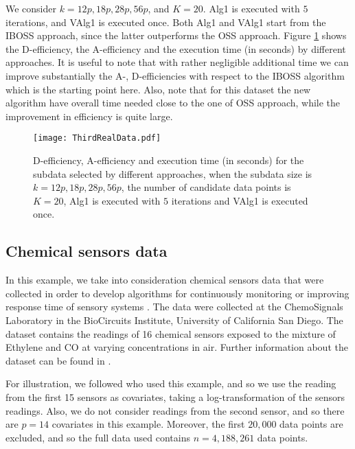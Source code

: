 \documentclass[12pt]{article}
\theoremstyle{definition}
\begin{document}
	We consider $k=12p, 18p, 28p, 56p$, and $K=20$. Alg1 is executed with $5$ iterations, and VAlg1 is executed once. Both Alg1 and VAlg1 start from the IBOSS approach, since the latter outperforms the OSS approach. Figure \ref{flights} shows the D-efficiency, the A-efficiency and the execution time (in seconds) by different approaches. It is useful to note that with rather negligible additional time we can improve substantially the A-, D-efficiencies with respect to the IBOSS algorithm which is the starting point here. Also, note that for this dataset the new algorithm have overall time needed close to the one of OSS approach, while the improvement in efficiency is quite large.
	
	\begin{figure}[!thb]
		\centering
		\texttt{[image: ThirdRealData.pdf]}
		\caption{D-efficiency, A-efficiency and execution time (in seconds) for the subdata selected by different approaches, when the subdata size is $k=12p, 18p, 28p, 56p$, the number of candidate data points is $K=20$, Alg1 is executed with $5$ iterations and VAlg1 is executed once.}
		\label{flights}
	\end{figure}
	
	
	
	\subsection{Chemical sensors data}
	In this example, we take into consideration chemical sensors data that were collected in order to develop algorithms for continuously monitoring or improving response time of sensory systems \citep{fonollosa2015}. The data were collected at the ChemoSignals Laboratory
	in the BioCircuits Institute, University of California San Diego. The dataset contains the readings of 16 chemical sensors exposed to the
	mixture of Ethylene and CO at varying concentrations in air. Further information about the dataset can be found in \cite{fonollosa2015}.
	
	For illustration, we followed \cite{wang2019information} who used this example, and so we use the reading from the first 15 sensors as covariates, taking a log-transformation of the sensors
	readings. Also, we do not consider readings from the second sensor, and so there are $p = 14$ covariates in this example. Moreover, the first $20,000$ data points are excluded, and so the full data used contains $n=4,188,261$ data points.
	
\end{document}
